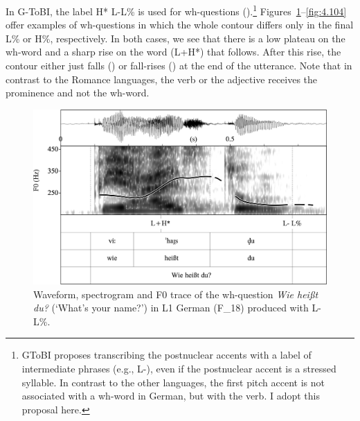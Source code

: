 In G-ToBI, the label H* L-L\% is used for wh-questions (\citealt{Féry1993, GriceBaumann2002, GriceEtAl2005a}).\footnote{GToBI proposes transcribing the postnuclear accents with a label of intermediate phrases (e.g., L-), even if the postnuclear accent is a stressed syllable. In contrast to the other languages, the first pitch accent is not associated with a wh-word in German, but with the verb. I adopt this proposal here.} Figures~\ref{fig:4.103}--\ref{fig:4.104} offer examples of wh-questions in which the whole contour differs only in the final L\% or H\%, respectively. In both cases, we see that there is a low plateau on the wh-word and a sharp rise on the word (L+H*) that follows. After this rise, the contour either just falls () or fall-rises () at the end of the utterance. Note that in contrast to the Romance languages, the verb or the adjective receives the prominence and not the wh-word.


\begin{figure}


\includegraphics[width=\textwidth]{figures/Figure_4.103.png}


\caption{Waveform, spectrogram and F0 trace of the wh-question \textit{Wie heißt du?} (‘What’s your name?’) in L1 German (F\_18) produced with L- L\%.}
\label{fig:4.103}
\end{figure}

